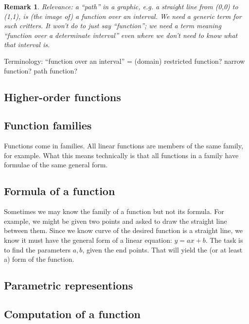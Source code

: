 \documentclass[12pt]{tufte-handout}
\numberwithin{equation}{subsection}
\numberwithin{equation}{subsection}
\newtheorem{remark}{Remark}
\begin{document}
  \begin{remark}
    Relevance: a ``path'' in a graphic, e.g. a straight line from
    (0,0) to (1,1), is (the image of) a function over an interval.  We
    need a generic term for such critters.  It won't do to just say
    ``function''; we need a term meaning ``function over a determinate
    interval'' even where we don't need to know what that interval is.
  \end{remark}

  {\todo Terminology: ``function over an interval'' = (domain)
    restricted function?  narrow function?  path function?}


  \subsection{Higher-order functions}
  \label{subs:hiordfunc}


  \subsection{Function families}
  \label{subs:funcfamilies}

  Functions come in families.  All linear functions are members of the
  same family, for example.  What this means technically is that all
  functions in a family have formulae of the same general form.

  \subsection{Formula of a function}
  \label{subs:funcform}

  Sometimes we may know the family of a function but not its formula.
  For example, we might be given two points and asked to draw the
  straight line between them.  Since we know curve of the desired
  function is a straight line, we know it must have the general form
  of a linear equation: \(y=ax+b\).  The task is to find the
  parameters \(a,b\), given the end points.  That will yield the (or
  at least a) form of the function.

  \subsection{Parametric representions}

  \subsection{Computation of a function}
\end{document}
